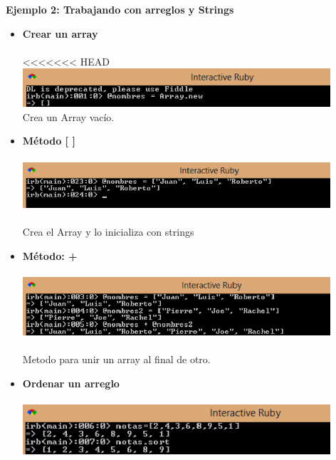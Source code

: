 \documentclass[11pt]{article} %
\begin{document}
 {\fontsize{14}{0} \bf Ejemplo 2: Trabajando con arreglos y Strings \\ }
\begin{itemize}
      \item {\bf Crear un array}\\\\
<<<<<<< HEAD
    \includegraphics[width=0.9\textwidth]{./imagenes/CreateArray}\\
Crea un Array vacío.\\


      \item {\bf Método [ ]} \\\\
    \includegraphics[width=0.9\textwidth]{./imagenes/InicializarArray}\\\\
Crea el Array y lo inicializa con strings\\
      \item {\bf Método: +}\\\\
    \includegraphics[width=0.9\textwidth]{./imagenes/Metodo+}\\\\
        Metodo para unir un array al final de otro.\\

     \item {\bf Ordenar un arreglo}\\\\
    \includegraphics[width=0.9\textwidth]{./imagenes/OrdenarArreglo}\\


\end{itemize}
\end{document}
